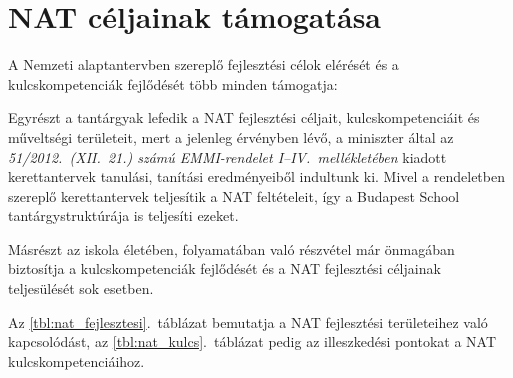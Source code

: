 \section{NAT céljainak támogatása}
\label{sec:nat_celjai}
A Nemzeti alaptantervben szereplő fejlesztési célok elérését és a
kulcskompetenciák fejlődését több minden támogatja:

Egyrészt a tantárgyak lefedik a NAT fejlesztési céljait, kulcskompetenciáit és
műveltségi területeit, mert a jelenleg érvényben lévő, a miniszter által az
\emph{51/2012.~(XII.~21.) számú EMMI-rendelet I--IV.~mellékletében} kiadott
kerettantervek \citep{ofi:kerettanterv} tanulási, tanítási eredményeiből
indultunk ki. Mivel a rendeletben szereplő kerettantervek teljesítik a NAT
feltételeit, így a Budapest School tantárgystruktúrája is teljesíti ezeket.

Másrészt az iskola életében, folyamatában való részvétel már önmagában
biztosítja a kulcskompetenciák fejlődését és a NAT fejlesztési céljainak
teljesülését sok esetben.

Az \ref{tbl:nat_fejlesztesi}.~táblázat bemutatja a NAT fejlesztési területeihez
való kapcsolódást, az
\ref{tbl:nat_kulcs}.~táblázat pedig az illeszkedési pontokat a NAT
kulcskompetenciáihoz.

